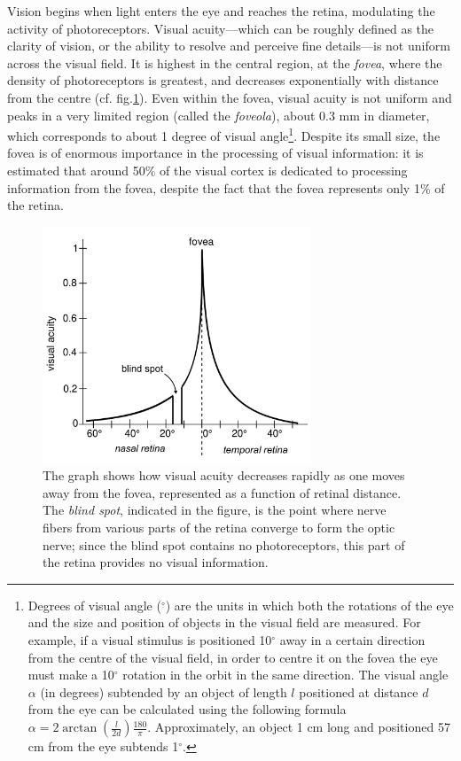 \documentclass[11pt]{article}
\begin{document}
Vision begins when light enters the eye and reaches the retina, modulating the activity of photoreceptors. Visual acuity—which can be roughly defined as the clarity of vision, or the ability to resolve and perceive fine details—is not uniform across the visual field. It is highest in the central region, at the \textit{fovea}, where the density of photoreceptors is greatest, and decreases exponentially with distance from the centre (cf. fig.\ref{fig1}). Even within the fovea, visual acuity is not uniform and peaks in a very limited region (called the \textit{foveola}), about 0.3 mm in diameter, which corresponds to about 1 degree of visual angle\footnote{Degrees of visual angle ($^{\circ}$) are the units in which both the rotations of the eye and the size and position of objects in the visual field are measured. For example, if a visual stimulus is positioned 10$^{\circ}$ away in a certain direction from the centre of the visual field, in order to centre it on the fovea the eye must make a 10$^{\circ}$ rotation in the orbit in the same direction. The visual angle $\alpha$ (in degrees) subtended by an object of length $l$ positioned at distance $d$ from the eye can be calculated using the following formula $\alpha = 2 \arctan(\frac{l}{2d}) \frac{180}{\pi}$. Approximately, an object 1 cm long and positioned 57 cm from the eye subtends 1$^{\circ}$.}. Despite its small size, the fovea is of enormous importance in the processing of visual information: it is estimated that around 50\% of the visual cortex is dedicated to processing information from the fovea, despite the fact that the fovea represents only 1\% of the retina.

\begin{figure}
\centering
\includegraphics[width=80mm]{fig1.pdf}
\caption{The graph shows how visual acuity decreases rapidly as one moves away from the fovea, represented as a function of retinal distance. The \textit{blind spot}, indicated in the figure, is the point where nerve fibers from various parts of the retina converge to form the optic nerve; since the blind spot contains no photoreceptors, this part of the retina provides no visual information.}

\label{fig1}
\end{figure}
\end{document}
